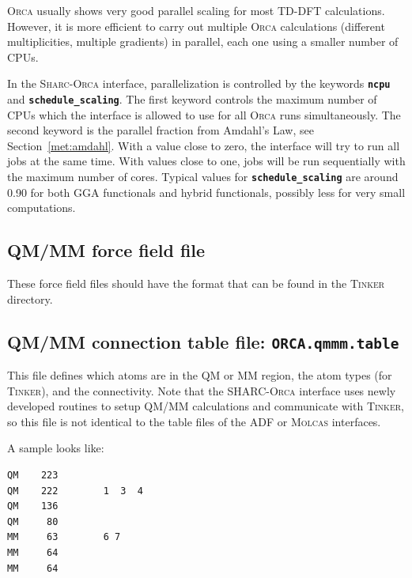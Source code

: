\documentclass[a4paper,10pt,DIV=15,openany]{scrbook}
\newcommand{\sharc}{\textsc{Sharc}}
\newcommand{\ttt}[1]{\textbf{\texttt{#1}}}
\newenvironment{example}{
  \setlength{\OuterFrameSep}{3pt}
  \vspace{0mm}
  \definecolor{shadecolor}{HTML}{E4F4FF}
  \begin{shaded}
}{
  \end{shaded}
}
\begin{document}
\textsc{Orca} usually shows very good parallel scaling for most TD-DFT calculations.
However, it is more efficient to carry out multiple \textsc{Orca} calculations (different multiplicities, multiple gradients) in parallel, each one using a smaller number of CPUs.

In the \sharc-\textsc{Orca} interface, parallelization is controlled by the keywords \ttt{ncpu} and \ttt{schedule\_scaling}.
The first keyword controls the maximum number of CPUs which the interface is allowed to use for all \textsc{Orca} runs simultaneously.
The second keyword is the parallel fraction from Amdahl's Law, see Section~\ref{met:amdahl}.
With a value close to zero, the interface will try to run all jobs at the same time. With values close to one, jobs will be run sequentially with the maximum number of cores.
Typical values for \ttt{schedule\_scaling} are around 0.90 for both GGA functionals and hybrid functionals,  possibly less for very small computations.




\subsection{QM/MM force field file}

These force field files should have the format that can be found in the \textsc{Tinker} directory.



\subsection{QM/MM connection table file: \ttt{ORCA.qmmm.table}}

This file defines which atoms are in the QM or MM region, the atom types (for \textsc{Tinker}), and the connectivity.
Note that the SHARC-\textsc{Orca} interface uses newly developed routines to setup QM/MM calculations and communicate with \textsc{Tinker}, so this file is not identical to the table files of the ADF or \textsc{Molcas} interfaces.

A sample looks like:

\begin{example}
\begin{verbatim}
QM    223        
QM    222        1  3  4
QM    136        
QM     80        
MM     63        6 7
MM     64       
MM     64       
\end{verbatim}
\end{example}
\end{document}
